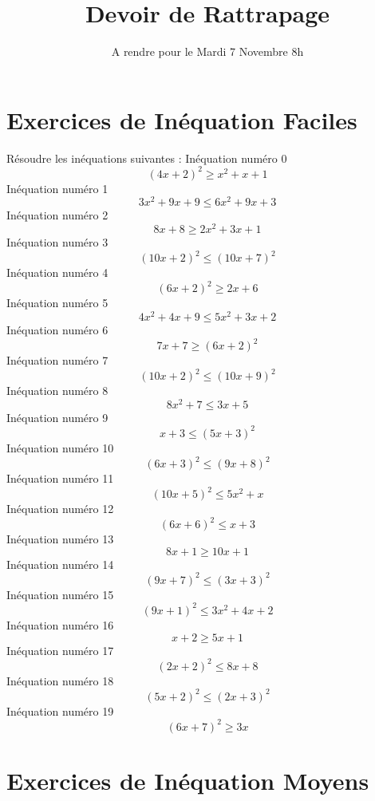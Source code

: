\documentclass{article}
\title{Devoir de Rattrapage}
\date{A rendre pour le Mardi 7 Novembre 8h}\usepackage{natbib}
\begin{document}
\maketitle
 \section{Exercices de In\'equation Faciles}

 R\'esoudre les in\'equations suivantes : 
In\'equation num\'ero 0 \[\left(4 x + 2\right)^{2} \geq x^{2} + x + 1\]In\'equation num\'ero 1 \[3 x^{2} + 9 x + 9 \leq 6 x^{2} + 9 x + 3\]In\'equation num\'ero 2 \[8 x + 8 \geq 2 x^{2} + 3 x + 1\]In\'equation num\'ero 3 \[\left(10 x + 2\right)^{2} \leq \left(10 x + 7\right)^{2}\]In\'equation num\'ero 4 \[\left(6 x + 2\right)^{2} \geq 2 x + 6\]In\'equation num\'ero 5 \[4 x^{2} + 4 x + 9 \leq 5 x^{2} + 3 x + 2\]In\'equation num\'ero 6 \[7 x + 7 \geq \left(6 x + 2\right)^{2}\]In\'equation num\'ero 7 \[\left(10 x + 2\right)^{2} \leq \left(10 x + 9\right)^{2}\]In\'equation num\'ero 8 \[8 x^{2} + 7 \leq 3 x + 5\]In\'equation num\'ero 9 \[x + 3 \leq \left(5 x + 3\right)^{2}\]In\'equation num\'ero 10 \[\left(6 x + 3\right)^{2} \leq \left(9 x + 8\right)^{2}\]In\'equation num\'ero 11 \[\left(10 x + 5\right)^{2} \leq 5 x^{2} + x\]In\'equation num\'ero 12 \[\left(6 x + 6\right)^{2} \leq x + 3\]In\'equation num\'ero 13 \[8 x + 1 \geq 10 x + 1\]In\'equation num\'ero 14 \[\left(9 x + 7\right)^{2} \leq \left(3 x + 3\right)^{2}\]In\'equation num\'ero 15 \[\left(9 x + 1\right)^{2} \leq 3 x^{2} + 4 x + 2\]In\'equation num\'ero 16 \[x + 2 \geq 5 x + 1\]In\'equation num\'ero 17 \[\left(2 x + 2\right)^{2} \leq 8 x + 8\]In\'equation num\'ero 18 \[\left(5 x + 2\right)^{2} \leq \left(2 x + 3\right)^{2}\]In\'equation num\'ero 19 \[\left(6 x + 7\right)^{2} \geq 3 x\]
 \section{Exercices de In\'equation Moyens}
\end{document}
